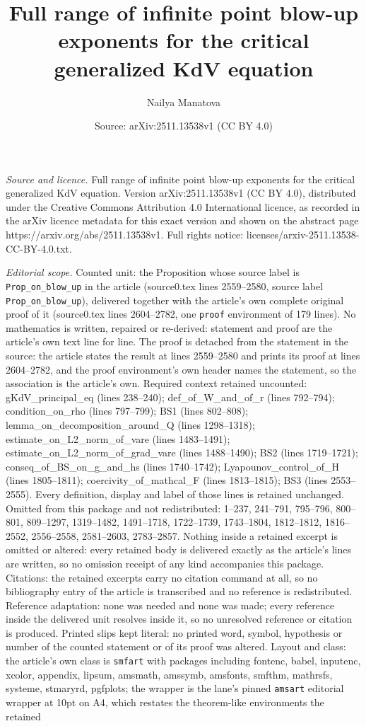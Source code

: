 \documentclass[10pt,a4paper]{amsart}
\title[Full range of infinite point blow-up exponents for the criti]{Full range of infinite point blow-up exponents for the critical generalized KdV equation}
\author{Nailya Manatova}
\date{Source: arXiv:2511.13538v1 (CC BY 4.0)}
\begin{document}
\maketitle

\noindent\emph{Source and licence.} Full range of infinite point blow-up exponents for the critical generalized KdV equation. Version arXiv:2511.13538v1 (CC BY 4.0), distributed under the Creative Commons Attribution 4.0 International licence, as recorded in the arXiv licence metadata for this exact version and shown on the abstract page https://arxiv.org/abs/2511.13538v1. Full rights notice: licenses/arxiv-2511.13538-CC-BY-4.0.txt.\par\smallskip

\noindent\textit{Editorial scope.} Counted unit: the Proposition whose source label is \texttt{Prop\_on\_blow\_up} in the article (source0.tex lines 2559--2580, source label \texttt{Prop\_on\_blow\_up}), delivered together with the article's own complete original proof of it (source0.tex lines 2604--2782, one \texttt{proof} environment of 179 lines). No mathematics is written, repaired or re-derived: statement and proof are the article's own text line for line. The proof is detached from the statement in the source: the article states the result at lines 2559--2580 and prints its proof at lines 2604--2782, and the proof environment's own header names the statement, so the association is the article's own. Required context retained uncounted: gKdV\_principal\_eq (lines 238--240); def\_of\_W\_and\_of\_r (lines 792--794); condition\_on\_rho (lines 797--799); BS1 (lines 802--808); lemma\_on\_decomposition\_around\_Q (lines 1298--1318); estimate\_on\_L2\_norm\_of\_vare (lines 1483--1491); estimate\_on\_L2\_norm\_of\_grad\_vare (lines 1488--1490); BS2 (lines 1719--1721); conseq\_of\_BS\_on\_g\_and\_hs (lines 1740--1742); Lyapounov\_control\_of\_H (lines 1805--1811); coercivity\_of\_mathcal\_F (lines 1813--1815); BS3 (lines 2553--2555). Every definition, display and label of those lines is retained unchanged. Omitted from this package and not redistributed: 1--237, 241--791, 795--796, 800--801, 809--1297, 1319--1482, 1491--1718, 1722--1739, 1743--1804, 1812--1812, 1816--2552, 2556--2558, 2581--2603, 2783--2857. Nothing inside a retained excerpt is omitted or altered: every retained body is delivered exactly as the article's lines are written, so no omission receipt of any kind accompanies this package. Citations: the retained excerpts carry no citation command at all, so no bibliography entry of the article is transcribed and no reference is redistributed. Reference adaptation: none was needed and none was made; every reference inside the delivered unit resolves inside it, so no unresolved reference or citation is produced. Printed slips kept literal: no printed word, symbol, hypothesis or number of the counted statement or of its proof was altered. Layout and class: the article's own class is \texttt{smfart} with packages including fontenc, babel, inputenc, xcolor, appendix, lipsum, amsmath, amssymb, amsfonts, smfthm, mathrsfs, systeme, stmaryrd, pgfplots; the wrapper is the lane's pinned \texttt{amsart} editorial wrapper at 10pt on A4, which restates the theorem-like environments the retained 
\end{document}
